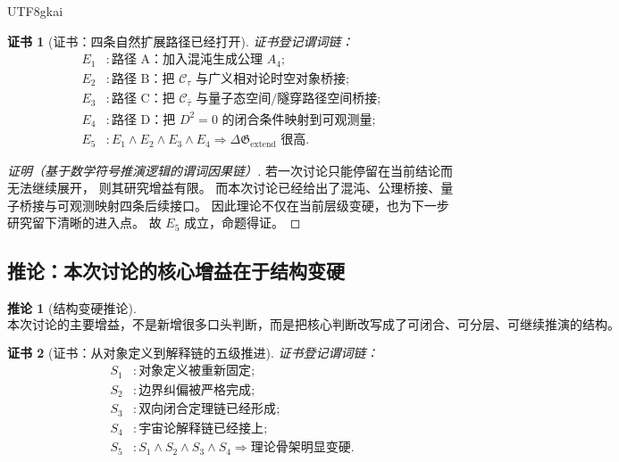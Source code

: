 \documentclass[12pt]{article}
\newtheorem{corollary}{推论}[section]
\newtheorem{Certificate}{证书}[section]
\begin{document}
\begin{CJK*}{UTF8}{gkai}
\begin{Certificate}[证书：四条自然扩展路径已经打开]
\label{cert:tex43-gain-extend}
证书登记谓词链：
\[
\begin{aligned}
  E_1 &: \text{路径 A：加入混沌生成公理 }A_4;\\
  E_2 &: \text{路径 B：把 }\mathcal C_\tau\text{ 与广义相对论时空对象桥接};\\
  E_3 &: \text{路径 C：把 }\mathcal C_{\bar\tau}\text{ 与量子态空间/隧穿路径空间桥接};\\
  E_4 &: \text{路径 D：把 }D^2=0\text{ 的闭合条件映射到可观测量};\\
  E_5 &: E_1\wedge E_2\wedge E_3\wedge E_4
         \Rightarrow
         \Delta \mathfrak G_{\mathrm{extend}} \text{ 很高}.
\end{aligned}
\]
\end{Certificate}

\begin{proof}[证明（基于数学符号推演逻辑的谓词因果链）]
若一次讨论只能停留在当前结论而无法继续展开，
则其研究增益有限。
而本次讨论已经给出了混沌、公理桥接、量子桥接与可观测映射四条后续接口。
因此理论不仅在当前层级变硬，也为下一步研究留下清晰的进入点。
故 $E_5$ 成立，命题得证。
\end{proof}

\subsection{推论：本次讨论的核心增益在于结构变硬}
\label{subsec:tex43-ch11-corollary-structure}

\begin{corollary}[结构变硬推论]
\label{cor:tex43-gain-structure}
\[
  \boxed{
    \text{本次讨论的主要增益，不是新增很多口头判断，}
    \text{而是把核心判断改写成了可闭合、可分层、可继续推演的结构。}
  }
\]
\end{corollary}

\begin{Certificate}[证书：从对象定义到解释链的五级推进]
\label{cert:tex43-gain-structure}
证书登记谓词链：
\[
\begin{aligned}
  S_1 &: \text{对象定义被重新固定};\\
  S_2 &: \text{边界纠偏被严格完成};\\
  S_3 &: \text{双向闭合定理链已经形成};\\
  S_4 &: \text{宇宙论解释链已经接上};\\
  S_5 &: S_1\wedge S_2\wedge S_3\wedge S_4
         \Rightarrow
         \text{理论骨架明显变硬}.
\end{aligned}
\]
\end{Certificate}


\end{CJK*}
\end{document}

